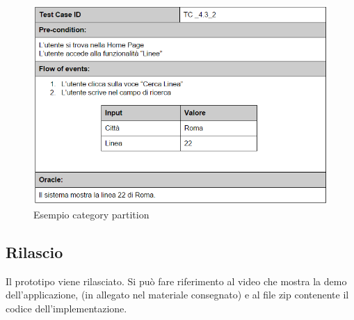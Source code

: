 \begin{figure}[h]
\centering
\includegraphics[scale=.6]{img/23.png}
\caption{Esempio category partition }
\label{fig:mhs}
\end{figure} 

\subsection{Rilascio}
Il prototipo viene rilasciato. Si può fare riferimento al video che mostra la demo dell\rq applicazione, (in allegato nel materiale consegnato) e al file zip contenente il codice dell'implementazione.
